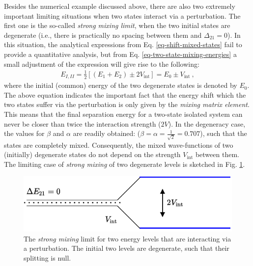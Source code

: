 
Besides the numerical example discussed above, there are also two extremely important limiting situations when two states interact via a perturbation. The first one is the so-called \emph{strong mixing limit}, when the two initial states are degenerate (i.e., there is practically no spacing between them and $\Delta_{21}=0$). In this situation, the analytical expressions from Eq. \ref{eq-shift-mixed-states} fail to provide a quantitative analysis, but from Eq. \ref{eq-two-state-mixing-energies} a small adjustment of the expression will give rise to the following:
\begin{align}
    E_{I,II}=\frac{1}{2}\left[(E_1+E_2)\pm2V_\text{int}\right]=E_0\pm V_\text{int}\ ,
\end{align}
where the initial (common) energy of the two degenerate states is denoted by $E_0$. The above equation indicates the important fact that the energy shift which the two states suffer via the perturbation is only given by the \emph{mixing matrix element}. This means that the final separation energy for a two-state isolated system can never be closer than twice the interaction strength ($2V$). In the degeneracy case, the values for $\beta$ and $\alpha$ are readily obtained: ($\beta=\alpha=\frac{1}{\sqrt{2}}=0.707$), such that the states are completely mixed. Consequently, the mixed wave-functions of two (initially) degenerate states do not depend on the strength $V_\text{int}$ between them. The limiting case of \emph{strong mixing} of two degenerate levels is sketched in Fig. \ref{strong-mixing-fig}.

\begin{figure}
    \centering
    \includegraphics[scale=0.95]{Chapters/Figures/mixing_strong_coupling.pdf}
    \caption{The \emph{strong mixing} limit for two energy levels that are interacting via a perturbation. The initial two levels are degenerate, such that their splitting is null.}
    \label{strong-mixing-fig}
\end{figure}

